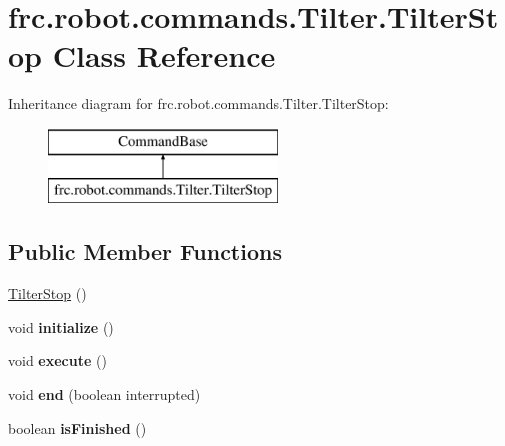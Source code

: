 \hypertarget{classfrc_1_1robot_1_1commands_1_1_tilter_1_1_tilter_stop}{}\section{frc.\+robot.\+commands.\+Tilter.\+Tilter\+Stop Class Reference}
\label{classfrc_1_1robot_1_1commands_1_1_tilter_1_1_tilter_stop}
Inheritance diagram for frc.\+robot.\+commands.\+Tilter.\+Tilter\+Stop\+:\begin{figure}[H]
\begin{center}
\leavevmode
\includegraphics[height=2.000000cm]{classfrc_1_1robot_1_1commands_1_1_tilter_1_1_tilter_stop}
\end{center}
\end{figure}
\subsection*{Public Member Functions}
\begin{DoxyCompactItemize}
\item 
\mbox{\hyperlink{classfrc_1_1robot_1_1commands_1_1_tilter_1_1_tilter_stop_a03670499a1e85fd5601387b6b1e55bdd}{Tilter\+Stop}} ()
\item 
\mbox{\label{classfrc_1_1robot_1_1commands_1_1_tilter_1_1_tilter_stop_a30d255315a9d53ce3fd59808a9748207}} 
void {\bfseries initialize} ()
\item 
\mbox{\label{classfrc_1_1robot_1_1commands_1_1_tilter_1_1_tilter_stop_a842db33c3d5e258d3a13d74a019aaabe}} 
void {\bfseries execute} ()
\item 
\mbox{\label{classfrc_1_1robot_1_1commands_1_1_tilter_1_1_tilter_stop_a4315bf585710bec423365b3afbb71d03}} 
void {\bfseries end} (boolean interrupted)
\item 
\mbox{\label{classfrc_1_1robot_1_1commands_1_1_tilter_1_1_tilter_stop_a2454699b5e2d65d2946766938a4cd871}} 
boolean {\bfseries is\+Finished} ()
\end{DoxyCompactItemize}


